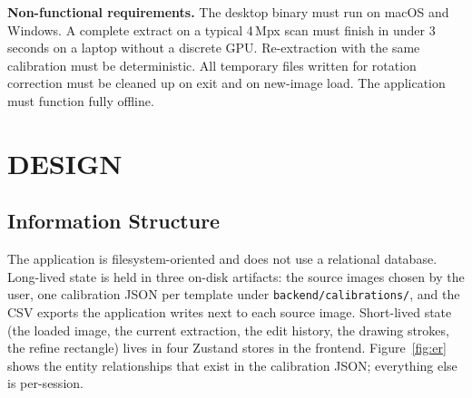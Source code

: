 \documentclass[a4paper,12pt]{report}
\begin{document}
\textbf{Non-functional requirements.} The desktop binary must run on macOS and Windows. A complete extract on a typical 4\,Mpx scan must finish in under 3 seconds on a laptop without a discrete GPU. Re-extraction with the same calibration must be deterministic. All temporary files written for rotation correction must be cleaned up on exit and on new-image load. The application must function fully offline.

\chapter{DESIGN}

\section{Information Structure}

The application is filesystem-oriented and does not use a relational database. Long-lived state is held in three on-disk artifacts: the source images chosen by the user, one calibration JSON per template under \texttt{backend/calibrations/}, and the CSV exports the application writes next to each source image. Short-lived state (the loaded image, the current extraction, the edit history, the drawing strokes, the refine rectangle) lives in four Zustand stores in the frontend. Figure~\ref{fig:er} shows the entity relationships that exist in the calibration JSON; everything else is per-session.
\end{document}
